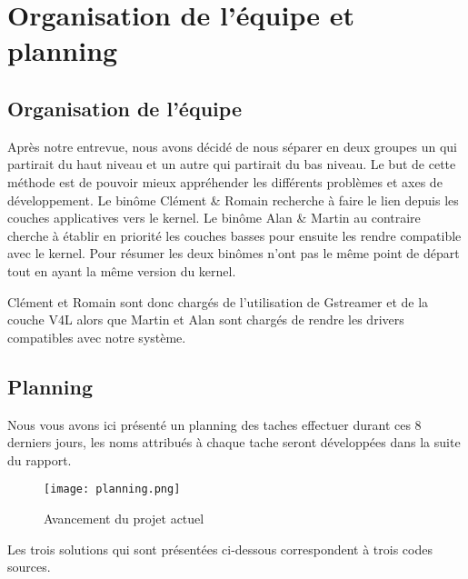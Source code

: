 
\chapter{Organisation de l'équipe et planning} %

\label{Chapter1} %


\section{Organisation de l'équipe}

Après notre entrevue, nous avons décidé de nous séparer en deux groupes un qui
partirait du haut niveau et un autre qui partirait du bas niveau. Le but de
cette méthode est de pouvoir mieux appréhender les différents problèmes et axes
de développement. Le binôme Clément \& Romain recherche à faire le lien depuis
les couches applicatives vers le kernel. Le binôme Alan \& Martin au contraire
cherche à établir en priorité les couches basses pour ensuite les rendre
compatible avec le kernel. Pour résumer les deux binômes n’ont pas le même point
de départ tout en ayant la même version du kernel.

Clément et Romain sont donc chargés de l’utilisation de Gstreamer et de la
couche V4L alors que Martin et Alan sont chargés de rendre les drivers
compatibles avec notre système.

\section{Planning}

Nous vous avons ici présenté un planning des taches effectuer durant ces 8 \\
derniers jours, les noms attribués à chaque tache seront développées dans la suite du rapport.

\begin{figure}[th]
    \centering
    \texttt{[image: planning.png]}
    \decoRule
    \caption{Avancement du projet actuel}  \label{fig:planning}
\end{figure}

Les trois solutions qui sont présentées ci-dessous correspondent à trois codes sources.

